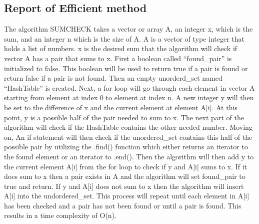 \documentclass[12pt]{article}
\begin{document}
	\subsection{Report of Efficient method}
	\indent \indent The algorithm SUM\-CHECK takes a vector or array A, an integer x, which is the sum, and an integer n which is the size of A. A is a vector of type integer that holds a list of numbers. x is the desired sum that the algorithm will check if vector A has a pair that sums to x. First a boolean called “found\_pair” is initialized to false. This boolean will be used to return true if a pair is found or return false if a pair is not found. Then an empty unorderd\_set named “HashTable” is created. Next, a for loop will go through each element in vector A starting from element at index 0 to element at index n. A new integer y will then be set to the difference of x and the current element at element A[i]. At this point, y is a possible half of the pair needed to sum to x. The next part of the algorithm will check if the HashTable contains the other needed number. Moving on, An if statement will then check if the unordered\_set contains this half of the possible pair by utilizing the .find() function which either returns an iterator to the found element or an iterator to .end(). Then the algorithm will then add y to the current element A[i] from the for loop to check if y and A[i] sums to x. If it does sum to x then a pair exists in A and the algorithm will set found\_pair to true and return. If y and A[i] does not sum to x then the algorithm will insert A[i] into the undordered\_set. This process will repeat until each element in A[i] has been checked and a pair has not been found or until a pair is found. This results in a time complexity of O(n).
\\
\\
\end{document}
